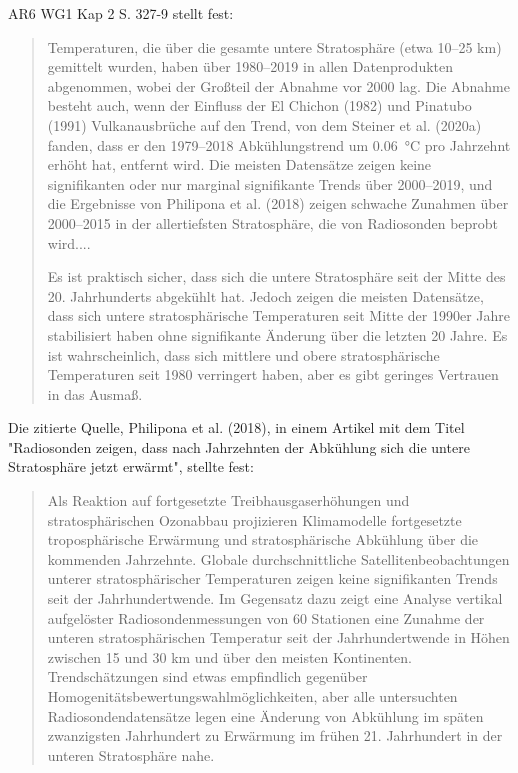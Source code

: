 \documentclass[12pt,paper=a4,DIV=12,parskip=never,chapterprefix=false,headings=standardclasses]{scrreprt}
\begin{document}
AR6 WG1 Kap 2 S. 327-9 stellt fest:
\begin{quote}
Temperaturen, die über die gesamte untere Stratosphäre (etwa 10–25 km) gemittelt wurden, haben über 1980–2019 in allen Datenprodukten abgenommen, wobei der Großteil der Abnahme vor 2000 lag. Die Abnahme besteht auch, wenn der Einfluss der El Chichon (1982) und Pinatubo (1991) Vulkanausbrüche auf den Trend, von dem Steiner et al. (2020a) fanden, dass er den 1979–2018 Abkühlungstrend um \SI{0.06}{\celsius} pro Jahrzehnt erhöht hat, entfernt wird. Die meisten Datensätze zeigen keine signifikanten oder nur marginal signifikante Trends über 2000–2019, und die Ergebnisse von Philipona et al. (2018) zeigen schwache Zunahmen über 2000–2015 in der allertiefsten Stratosphäre, die von Radiosonden beprobt wird....

Es ist praktisch sicher, dass sich die untere Stratosphäre seit der Mitte des 20. Jahrhunderts abgekühlt hat. Jedoch zeigen die meisten Datensätze, dass sich untere stratosphärische Temperaturen seit Mitte der 1990er Jahre stabilisiert haben ohne signifikante Änderung über die letzten 20 Jahre. Es ist wahrscheinlich, dass sich mittlere und obere stratosphärische Temperaturen seit 1980 verringert haben, aber es gibt geringes Vertrauen in das Ausmaß.
\end{quote}

Die zitierte Quelle, Philipona et al. (2018), in einem Artikel mit dem Titel "Radiosonden zeigen, dass nach Jahrzehnten der Abkühlung sich die untere Stratosphäre jetzt erwärmt", stellte fest:
\begin{quote}
Als Reaktion auf fortgesetzte Treibhausgaserhöhungen und stratosphärischen Ozonabbau projizieren Klimamodelle fortgesetzte troposphärische Erwärmung und stratosphärische Abkühlung über die kommenden Jahrzehnte. Globale durchschnittliche Satellitenbeobachtungen unterer stratosphärischer Temperaturen zeigen keine signifikanten Trends seit der Jahrhundertwende. Im Gegensatz dazu zeigt eine Analyse vertikal aufgelöster Radiosondenmessungen von 60 Stationen eine Zunahme der unteren stratosphärischen Temperatur seit der Jahrhundertwende in Höhen zwischen 15 und 30 km und über den meisten Kontinenten. Trendschätzungen sind etwas empfindlich gegenüber Homogenitätsbewertungswahlmöglichkeiten, aber alle untersuchten Radiosondendatensätze legen eine Änderung von Abkühlung im späten zwanzigsten Jahrhundert zu Erwärmung im frühen 21. Jahrhundert in der unteren Stratosphäre nahe.
\end{quote}
\end{document}

